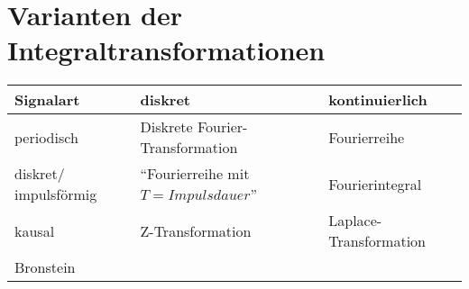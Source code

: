 \section{Varianten der Integraltransformationen } %
	\begin{tabular}{|l||l|l|}
	\hline
	\textbf{Signalart}
		& diskret
		& kontinuierlich \\
	\hline \hline
	periodisch
		& Diskrete Fourier-Transformation
		& Fourierreihe \\
	\hline
	diskret/ impulsförmig
		& ``Fourierreihe mit $T = Impulsdauer$''
		& Fourierintegral \\
	\hline
	kausal
		& Z-Transformation
		& Laplace-Transformation \\Bronstein
	\hline
	\end{tabular}